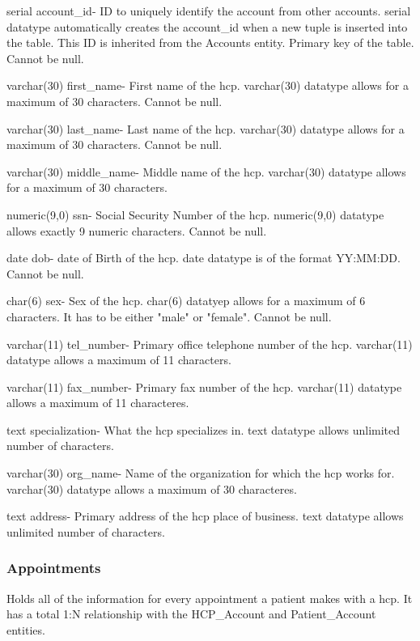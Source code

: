 \documentclass[12pt]{report}
\begin{document}
\begin{description}
\item serial account\_id- ID to uniquely identify the account from other accounts. serial datatype automatically creates the account\_id when a new tuple is inserted into the table.  This ID is inherited from the Accounts entity. Primary key of the table.  Cannot be null.
\item varchar(30) first\_name-  First name of the hcp.  varchar(30) datatype allows for a maximum of 30 characters.  Cannot be null.
\item varchar(30) last\_name- Last name of the hcp.  varchar(30) datatype allows for a maximum of 30 characters.  Cannot be null.
\item varchar(30) middle\_name- Middle name of the hcp. varchar(30) datatype allows for a maximum of 30 characters.
\item numeric(9,0) ssn- Social Security Number of the hcp. numeric(9,0) datatype allows exactly 9 numeric characters.  Cannot be null.
\item date dob- date of Birth of the hcp.  date datatype is of the format YY:MM:DD.  Cannot be null.
\item char(6) sex- Sex of the hcp. char(6) datatyep allows for a maximum of 6 characters.  It has to be either "male" or "female".  Cannot be null.
\item varchar(11) tel\_number- Primary office telephone number of the hcp.  varchar(11) datatype allows a maximum of 11 characters.
\item varchar(11) fax\_number- Primary fax number of the hcp.  varchar(11) datatype allows a maximum of 11 characteres.
\item text specialization- What the hcp specializes in.  text datatype allows unlimited number of characters.
\item varchar(30) org\_name- Name of the organization for which the hcp works for.  varchar(30) datatype allows a maximum of 30 characteres.
\item text address- Primary address of the hcp place of business.  text datatype allows unlimited number of characters.
\end{description}

\subsubsection{Appointments}
Holds all of the information for every appointment a patient makes with a hcp.  It has a total 1:N relationship with the HCP\_Account and Patient\_Account entities.
\end{document}
